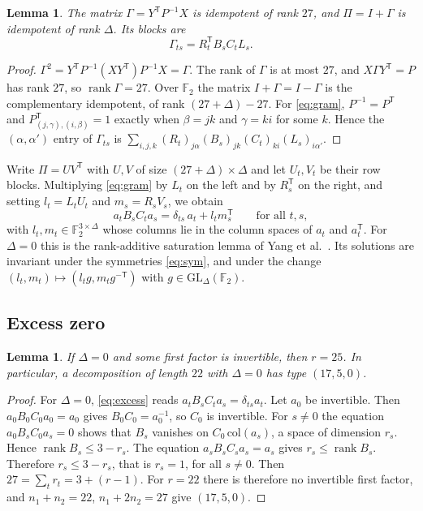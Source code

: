 \documentclass[11pt]{amsart}
\newtheorem{lemma}[theorem]{Lemma}
\theoremstyle{definition}
\theoremstyle{remark}
\numberwithin{equation}{section}
\newcommand{\F}{\mathbb{F}_2}
\newcommand{\rk}{\operatorname{rank}}
\begin{document}
\begin{lemma}\label{lem:gram}
The matrix $\Gamma=Y^{\mathsf T}P^{-1}X$ is idempotent of rank $27$, and $\Pi=I+\Gamma$ is idempotent of rank $\Delta$. Its blocks are
\begin{equation}\label{eq:gram}
\Gamma_{ts}=R_t^{\mathsf T}B_sC_tL_s .
\end{equation}
\end{lemma}

\begin{proof}
$\Gamma^2=Y^{\mathsf T}P^{-1}(XY^{\mathsf T})P^{-1}X=\Gamma$. The rank of $\Gamma$ is at most $27$, and $X\Gamma Y^{\mathsf T}=P$ has rank $27$, so $\rk\Gamma=27$. Over $\F$ the matrix $I+\Gamma=I-\Gamma$ is the complementary idempotent, of rank $(27+\Delta)-27$. For \eqref{eq:gram}, $P^{-1}=P^{\mathsf T}$ and $P^{\mathsf T}_{(j,\gamma),(i,\beta)}=1$ exactly when $\beta=jk$ and $\gamma=ki$ for some $k$. Hence the $(\alpha,\alpha')$ entry of $\Gamma_{ts}$ is $\sum_{i,j,k}(R_t)_{j\alpha}(B_s)_{jk}(C_t)_{ki}(L_s)_{i\alpha'}$.
\end{proof}

Write $\Pi=UV^{\mathsf T}$ with $U,V$ of size $(27+\Delta)\times\Delta$ and let $U_t,V_t$ be their row blocks. Multiplying \eqref{eq:gram} by $L_t$ on the left and by $R_s^{\mathsf T}$ on the right, and setting $l_t=L_tU_t$ and $m_s=R_sV_s$, we obtain
\begin{equation}\label{eq:excess}
a_tB_sC_ta_s=\delta_{ts}\,a_t+l_tm_s^{\mathsf T}\qquad\text{for all }t,s,
\end{equation}
with $l_t,m_t\in\F^{3\times\Delta}$ whose columns lie in the column spaces of $a_t$ and $a_t^{\mathsf T}$. For $\Delta=0$ this is the rank-additive saturation lemma of Yang et al.\ \cite[Lemma~5.1]{Yan26}. Its solutions are invariant under the symmetries \eqref{eq:sym}, and under the change $(l_t,m_t)\mapsto(l_tg,m_tg^{-\mathsf T})$ with $g\in\mathrm{GL}_\Delta(\F)$.

\subsection{Excess zero}

\begin{lemma}\label{lem:S}
If $\Delta=0$ and some first factor is invertible, then $r=25$. In particular, a decomposition of length $22$ with $\Delta=0$ has type $(17,5,0)$.
\end{lemma}

\begin{proof}
For $\Delta=0$, \eqref{eq:excess} reads $a_tB_sC_ta_s=\delta_{ts}a_t$. Let $a_0$ be invertible. Then $a_0B_0C_0a_0=a_0$ gives $B_0C_0=a_0^{-1}$, so $C_0$ is invertible. For $s\ne 0$ the equation $a_0B_sC_0a_s=0$ shows that $B_s$ vanishes on $C_0\,\mathrm{col}(a_s)$, a space of dimension $r_s$. Hence $\rk B_s\le 3-r_s$. The equation $a_sB_sC_sa_s=a_s$ gives $r_s\le\rk B_s$. Therefore $r_s\le 3-r_s$, that is $r_s=1$, for all $s\ne 0$. Then $27=\sum_tr_t=3+(r-1)$. For $r=22$ there is therefore no invertible first factor, and $n_1+n_2=22$, $n_1+2n_2=27$ give $(17,5,0)$.
\end{proof}
\end{document}
